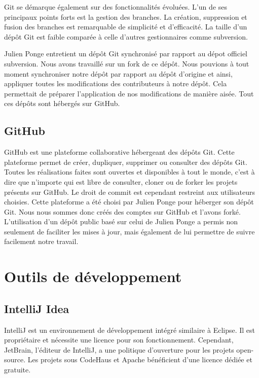 Git se démarque également sur des fonctionnalités évoluées.
L'un de ses principaux points forts est la gestion des branches.
La création, suppression et fusion des branches est remarquable de simplicité et d'efficacité.
La taille d'un dépôt Git est faible comparée à celle d'autres gestionnaires comme subversion.

Julien Ponge entretient un dépôt Git synchronisé par rapport au dépot officiel subversion.
Nous avons travaillé sur un fork de ce dépôt.
Nous pouvions à tout moment synchroniser notre dépôt par rapport au dépôt d'origine et ainsi, appliquer toutes les modifications des contributeurs à notre dépôt.
Cela permettait de préparer l'application de nos modifications de manière aisée. Tout ces dépôts sont hébergés sur GitHub.
\subsection{GitHub}
GitHub est une plateforme collaborative hébergeant des dépôts Git.
Cette plateforme permet de créer, dupliquer, supprimer ou consulter des dépôts Git.
Toutes les réalisations faites sont ouvertes et disponibles à tout le monde, c'est à dire que n'importe qui est libre de consulter, cloner ou de forker les projets présents sur GitHub.
Le droit de commit est cependant restreint aux utilisateurs choisies.
Cette plateforme a été choisi par Julien Ponge pour héberger son dépôt Git.
Nous nous sommes donc créés des comptes sur GitHub et l'avons forké.
L'utilisation d'un dépôt public basé sur celui de Julien Ponge a permis non seulement de faciliter les mises à jour, mais également de lui permettre de suivre facilement notre travail.
\section{Outils de développement}
\subsection{IntelliJ Idea}
IntelliJ est un environnement de développement intégré similaire à Eclipse.
Il est propriétaire et nécessite une licence pour son fonctionnement.
Cependant, JetBrain, l'éditeur de IntelliJ, a une politique d'ouverture pour les projets open-source.
Les projets sous CodeHaus et Apache bénéficient d'une licence dédiée et gratuite.

